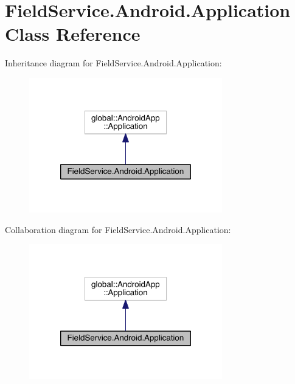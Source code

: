 \hypertarget{class_field_service_1_1_android_1_1_application}{\section{Field\+Service.\+Android.\+Application Class Reference}
\label{class_field_service_1_1_android_1_1_application}
}


Inheritance diagram for Field\+Service.\+Android.\+Application\+:
\nopagebreak
\begin{figure}[H]
\begin{center}
\leavevmode
\includegraphics[width=238pt]{class_field_service_1_1_android_1_1_application__inherit__graph}
\end{center}
\end{figure}


Collaboration diagram for Field\+Service.\+Android.\+Application\+:
\nopagebreak
\begin{figure}[H]
\begin{center}
\leavevmode
\includegraphics[width=238pt]{class_field_service_1_1_android_1_1_application__coll__graph}
\end{center}
\end{figure}
